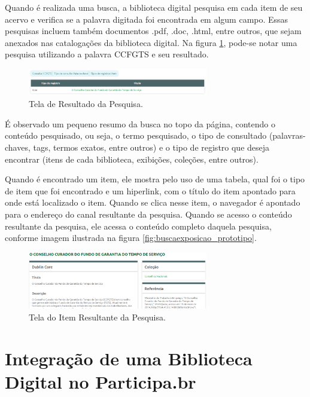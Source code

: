 Quando é realizada uma busca, a biblioteca digital pesquisa em cada item de seu acervo e verifica se a palavra digitada foi encontrada em algum campo. Essas pesquisas incluem também documentos .pdf, .doc, .html, entre outros, que sejam anexados nas catalogações da biblioteca digital. Na figura \ref{fig:resultante_prototipo}, pode-se notar uma pesquisa utilizando a palavra CCFGTS e seu resultado.

\graphicspath{{figuras/prototipo/}}
\begin{figure}[H]
\centering
\includegraphics[width=0.7\textwidth]{resultado-pesquisa}
\caption{Tela de Resultado da Pesquisa.}
\label{fig:resultante_prototipo}
\end{figure}

É observado um pequeno resumo da busca no topo da página, contendo o conteúdo pesquisado, ou seja, o termo pesquisado, o tipo de consultado (palavras-chaves, tags, termos exatos, entre outros) e o tipo de registro que deseja encontrar (itens de cada biblioteca, exibições, coleções, entre outros). 
  
Quando é encontrado um item, ele mostra pelo uso de uma tabela, qual foi o tipo de item que foi encontrado e um hiperlink, com o título do item apontado para onde está localizado o item. Quando se clica nesse item, o navegador é apontado para o endereço do canal resultante da pesquisa. Quando se acesso o conteúdo resultante da pesquisa, ele acessa o conteúdo completo daquela pesquisa, conforme imagem ilustrada na figura \ref{fig:buscaexposicao_prototipo}. 

\graphicspath{{figuras/prototipo/}}
\begin{figure}[H]
\centering
\includegraphics[width=0.7\textwidth]{resultante-pesquisa}
\caption{Tela do Item Resultante da Pesquisa.}
\label{fig:resulpesquisa_prototipo}
\end{figure}

\section{Integração de uma Biblioteca Digital no Participa.br}





